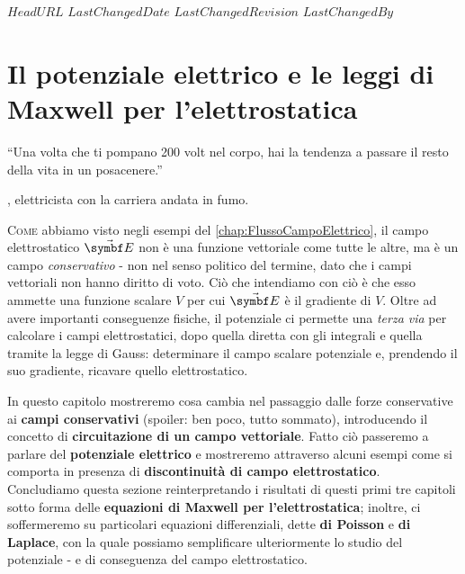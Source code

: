\svnidlong
{$HeadURL$}
{$LastChangedDate$}
{$LastChangedRevision$}
{$LastChangedBy$}

\chapter{Il potenziale elettrico e le leggi di Maxwell per l'elettrostatica} %
\begin{introduction}
	``Una volta che ti pompano 200 volt nel corpo, hai la tendenza a passare il resto della vita in un posacenere.''
	\begin{flushright}
		, elettricista con la carriera andata in fumo.
	\end{flushright}
\end{introduction}
\lettrine[findent=1pt, nindent=0pt]{C}{ome} abbiamo visto negli esempi del \autoref{chap:FlussoCampoElettrico}, il campo elettrostatico $\vba{E}$ non è una funzione vettoriale come tutte le altre, ma è un campo \textit{conservativo} - non nel senso politico del termine, dato che i campi vettoriali non hanno diritto di voto. Ciò che intendiamo con ciò è che esso ammette una funzione scalare $V$ per cui $\vba{E}$ è il gradiente di $V$. Oltre ad avere importanti conseguenze fisiche, il potenziale ci permette una \textit{terza via} per calcolare i campi elettrostatici, dopo quella diretta con gli integrali e quella tramite la legge di Gauss: determinare il campo scalare potenziale e, prendendo il suo gradiente, ricavare quello elettrostatico.

In questo capitolo mostreremo cosa cambia nel passaggio dalle forze conservative ai \textbf{campi conservativi} (spoiler: ben poco, tutto sommato), introducendo il concetto di \textbf{circuitazione di un campo vettoriale}. Fatto ciò passeremo a parlare del \textbf{potenziale elettrico} e mostreremo attraverso alcuni esempi come si comporta in presenza di \textbf{discontinuità di campo elettrostatico}.\\
Concludiamo questa sezione reinterpretando i risultati di questi primi tre capitoli sotto forma delle \textbf{equazioni di Maxwell per l'elettrostatica}; inoltre, ci soffermeremo su particolari equazioni differenziali, dette \textbf{di Poisson} e \textbf{di Laplace}, con la quale possiamo semplificare ulteriormente lo studio del potenziale - e di conseguenza del campo elettrostatico.
\vfill
\pagebreak
